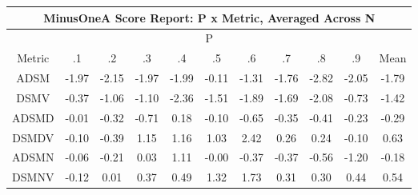 \begin{longtable}{ | c || c | c | c | c | c | c | c | c | c || c |}
\hline
\multicolumn{11}{|c|}{ MinusOneA Score Report: P x Metric, Averaged Across N } \\
\hline
\multicolumn{11}{|c|}{ P } \\
\hline
Metric & .1 & .2 & .3 & .4 & .5 & .6 & .7 & .8 & .9 & Mean\\
\hline
\hline
\endhead
ADSM &  \cellcolor[HTML]{FFCFCF} -1.97 &  \cellcolor[HTML]{FFC7C7} -2.15 &  \cellcolor[HTML]{FFCFCF} -1.97 &  \cellcolor[HTML]{FFCFCF} -1.99 &  \cellcolor[HTML]{FFFFFF} -0.11 &  \cellcolor[HTML]{FFDFDF} -1.31 &  \cellcolor[HTML]{FFCFCF} -1.76 &  \cellcolor[HTML]{FFB7B7} -2.82 &  \cellcolor[HTML]{FFCFCF} -2.05 &  \cellcolor[HTML]{FFCFCF} -1.79 \\
DSMV &  \cellcolor[HTML]{FFF7F7} -0.37 &  \cellcolor[HTML]{FFE7E7} -1.06 &  \cellcolor[HTML]{FFE7E7} -1.10 &  \cellcolor[HTML]{FFC7C7} -2.36 &  \cellcolor[HTML]{FFD7D7} -1.51 &  \cellcolor[HTML]{FFCFCF} -1.89 &  \cellcolor[HTML]{FFD7D7} -1.69 &  \cellcolor[HTML]{FFC7C7} -2.08 &  \cellcolor[HTML]{FFEFEF} -0.73 &  \cellcolor[HTML]{FFDFDF} -1.42 \\
ADSMD &  \cellcolor[HTML]{FFFFFF} -0.01 &  \cellcolor[HTML]{FFF7F7} -0.32 &  \cellcolor[HTML]{FFEFEF} -0.71 &  \cellcolor[HTML]{F7F7FF} 0.18 &  \cellcolor[HTML]{FFFFFF} -0.10 &  \cellcolor[HTML]{FFEFEF} -0.65 &  \cellcolor[HTML]{FFF7F7} -0.35 &  \cellcolor[HTML]{FFF7F7} -0.41 &  \cellcolor[HTML]{FFF7F7} -0.23 &  \cellcolor[HTML]{FFF7F7} -0.29 \\
DSMDV &  \cellcolor[HTML]{FFFFFF} -0.10 &  \cellcolor[HTML]{FFF7F7} -0.39 &  \cellcolor[HTML]{DFDFFF} 1.15 &  \cellcolor[HTML]{DFDFFF} 1.16 &  \cellcolor[HTML]{E7E7FF} 1.03 &  \cellcolor[HTML]{BFBFFF} 2.42 &  \cellcolor[HTML]{F7F7FF} 0.26 &  \cellcolor[HTML]{F7F7FF} 0.24 &  \cellcolor[HTML]{FFFFFF} -0.10 &  \cellcolor[HTML]{EFEFFF} 0.63 \\
ADSMN &  \cellcolor[HTML]{FFFFFF} -0.06 &  \cellcolor[HTML]{FFF7F7} -0.21 &  \cellcolor[HTML]{FFFFFF} 0.03 &  \cellcolor[HTML]{E7E7FF} 1.11 &  \cellcolor[HTML]{FFFFFF} -0.00 &  \cellcolor[HTML]{FFF7F7} -0.37 &  \cellcolor[HTML]{FFF7F7} -0.37 &  \cellcolor[HTML]{FFEFEF} -0.56 &  \cellcolor[HTML]{FFDFDF} -1.20 &  \cellcolor[HTML]{FFF7F7} -0.18 \\
DSMNV &  \cellcolor[HTML]{FFFFFF} -0.12 &  \cellcolor[HTML]{FFFFFF} 0.01 &  \cellcolor[HTML]{F7F7FF} 0.37 &  \cellcolor[HTML]{EFEFFF} 0.49 &  \cellcolor[HTML]{DFDFFF} 1.32 &  \cellcolor[HTML]{D7D7FF} 1.73 &  \cellcolor[HTML]{F7F7FF} 0.31 &  \cellcolor[HTML]{F7F7FF} 0.30 &  \cellcolor[HTML]{F7F7FF} 0.44 &  \cellcolor[HTML]{EFEFFF} 0.54 \\

\end{longtable}
